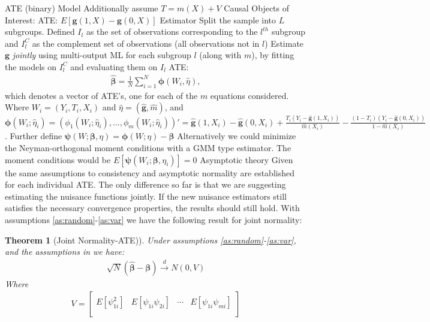 \documentclass[12pt]{article}
\newtheorem{theorem}{Theorem}
\begin{document}
\begin{outline}[enumerate]
		\2 ATE (binary)
			\3 Model
				\4 Additionally assume $T = m(X) + V$
			\3 Causal Objects of Interest:
				\4 ATE: $E[\pmb{g}(1,X)-\pmb{g}(0,X)]$
			\3 Estimator
				\4 Split the sample into $L$ subgroups. Defined $I_l$ as the set of observations corresponding to the $l^{th}$ subgroup and $I_{l}^C$ as the complement set of observations (all observations not in $l$) 
				\4 Estimate $\mathbf{g}$ \textit{jointly} using multi-output ML for each subgroup $l$ (along with $m$), by fitting the models on $I_{l}^C$ and evaluating them on $I_{l}$
				\4 ATE:
					\begin{align*}
					\hat{\pmb{\beta}} = \frac{1}{N}\sum_{i=1}^N \pmb{\phi}(W_i,\hat{\eta}),
					\end{align*}
					which denotes a vector of ATE's, one for each of the $m$ equations considered. Where $W_i = (Y_i,T_i,X_i)$ and $\hat{\eta} = (\pmb{\hat{g}},\hat{m})$, and \\$\pmb{\phi}(W_i;\hat{\eta}_i) = (\phi_1(W_i;\hat{\eta}_i),...,\phi_m(W_i;\hat{\eta}_i))' = \hat{\pmb{g}}(1,X_i) - \hat{\pmb{g}}(0,X_i) + \frac{T_i(Y_i-\hat{\pmb{g}}(1,X_i))}{\hat{m}(X_i)} - \frac{(1-T_i)(Y_i-\hat{\pmb{g}}(0,X_i))}{1-\hat{m}(X_i)}$.
				\4 Further define $\pmb{\psi}(W;\pmb{\beta},\eta) = \pmb{\phi}(W;\eta) - \pmb{\beta}$
				\4 Alternatively we could minimize the Neyman-orthogonal moment conditions with a GMM type estimator. The moment conditions would be $E[\pmb{\psi}(W_i;\pmb{\beta},\eta_i)] = 0$
			\3 Asymptotic theory
				\4 Given the same assumptions to \cite{chernozhukov2018double} consistency and asymptotic normality are established for each individual ATE. The only difference so far is that we are suggesting estimating the nuisance functions jointly. If the new nuisance estimators still satisfies the necessary convergence properties, the results should still hold.
				\4 With assumptions \ref{as:random}-\ref{as:var} we have the following result for joint normality:
					\begin{theorem}[Joint Normality-ATE)]\label{norm:ate}
						Under assumptions \ref{as:random}-\ref{as:var}, and the assumptions in \cite{chernozhukov2018double} we have: 
						\begin{align*}
							\sqrt{N}(\hat{\pmb{\beta}} - \pmb{\beta}) \xrightarrow[]{d} N(0,V)
						\end{align*}
						Where
						\begin{align*}
							V = 
							\begin{bmatrix}
								E[\psi_{1i}^2] 	& E[\psi_{1i}\psi_{2i}] & \cdots & E[\psi_{1i}\psi_{mi}] \\

\end{bmatrix}
\end{align*}
\end{theorem}
\end{outline}
\end{document}
